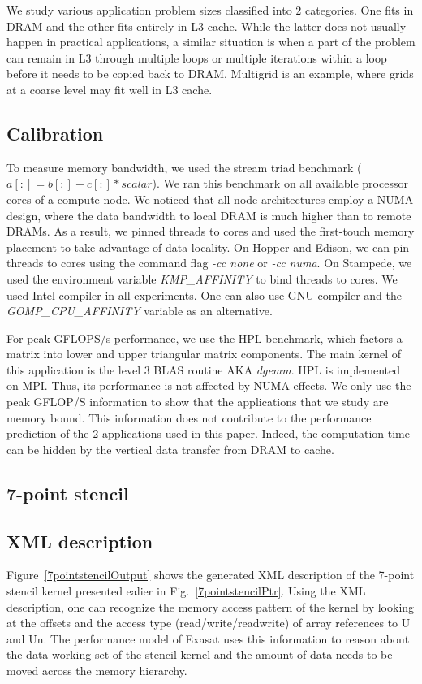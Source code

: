 \documentclass{article}
\begin{document}
We study various application problem sizes classified into 2 categories.
One fits in DRAM and the other fits entirely in L3 cache.
While the latter does not usually happen in practical applications, a similar situation is when a part of the problem can remain in L3 through multiple loops or multiple iterations within a loop before it needs to be copied back to DRAM.
Multigrid is an example, where grids at a coarse level may fit well in L3 cache.

\subsection{Calibration}
To measure memory bandwidth, we used the stream triad benchmark ($a[:] = b[:] + c[:] * scalar$).
We ran this benchmark on all available processor cores of a compute node.
We noticed that all node architectures employ a NUMA design, where the data bandwidth to local DRAM is much higher than to remote DRAMs.
As a result, we pinned threads to cores and used the first-touch memory placement to take advantage of data locality.
On Hopper and Edison, we can pin threads to cores using the command flag {\em -cc none} or {\em -cc numa}. 
On Stampede, we used the environment variable {\em KMP\_AFFINITY} to bind threads to cores.
We used Intel compiler in all experiments.
One can also use GNU compiler and the {\em GOMP\_CPU\_AFFINITY} variable as an alternative.

For peak GFLOPS/s performance, we use the HPL benchmark, which factors a matrix into lower and upper triangular matrix components.
The main kernel of this application is the level 3 BLAS routine AKA {\em dgemm}.
HPL is implemented on MPI.
Thus, its performance is not affected by NUMA effects.
We only use the peak GFLOP/S information to show that the applications that we study are memory bound.
This information does not contribute to the performance prediction of the 2 applications used in this paper.
Indeed, the computation time can be hidden by the vertical data transfer from DRAM to cache.


\subsection{7-point stencil}

\subsection{XML description}
Figure~\ref{7pointstencilOutput} shows the generated XML description of the 7-point stencil kernel presented ealier in Fig.~\ref{7pointstencilPtr}.
Using the XML description, one can recognize the memory access pattern of the kernel by looking at the offsets  and the access type (read/write/readwrite) of array references to U and Un.
The performance model of Exasat uses this information to reason about the data working set of the stencil kernel and the amount of data needs to be moved across the memory hierarchy.
\end{document}
